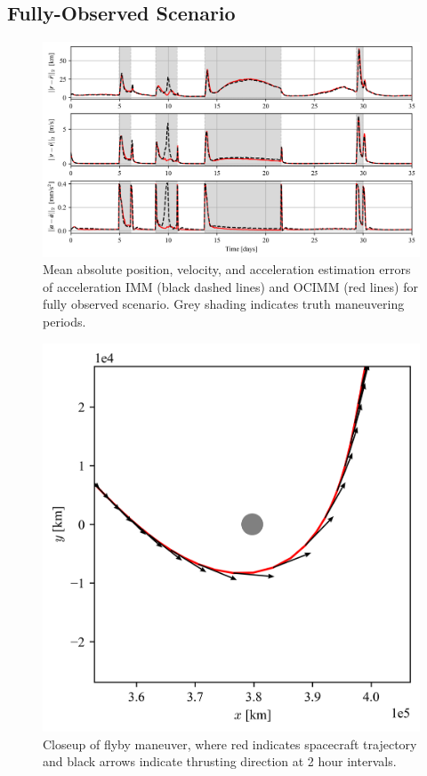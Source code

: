 \documentclass[letterpaper, preprint, paper,11pt]{AAS}	%
\begin{document}
\subsection{Fully-Observed Scenario}

\begin{figure}
    \centering
    \includegraphics[width=1\linewidth]{Figures/MAE_normal.png}
    \caption{Mean absolute position, velocity, and acceleration estimation errors of acceleration IMM (black dashed lines) and OCIMM (red lines) for fully observed scenario. Grey shading indicates truth maneuvering periods.}
    \label{fig:MAE-normal}
\end{figure}

\begin{figure}
    \centering
    \includegraphics[width=0.4\linewidth]{Figures/closeup.png}
    \caption{Closeup of flyby maneuver, where red indicates spacecraft trajectory and black arrows indicate thrusting direction at 2 hour intervals.}
    \label{fig:closeup}
\end{figure}
\end{document}
